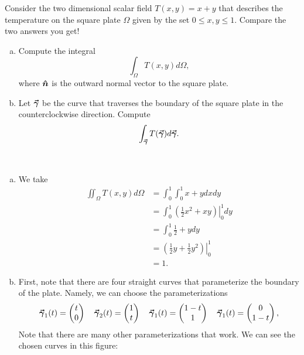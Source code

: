 \documentclass[12pt]{article} %
\begin{document}
\newpage
\begin{problem}
Consider the two dimensional scalar field $T(x,y)=x+y$ that describes the temperature on the square plate $\Omega$ given by the set $0\leq x,y \leq 1$.  Compare the two answers you get!
\begin{enumerate}[(a)]
	\item Compute the integral
	\[
	\int_\Omega T(x,y)d\Omega,
	\]
	where $\boldsymbol{\hat{n}}$ is the outward normal vector to the square plate.
	\item Let $\boldsymbol{\vec{\gamma}}$ be the curve that traverses the boundary of the square plate in the counterclockwise direction.  Compute
	\[
	\int_{\boldsymbol{\vec{\gamma}}} T(\boldsymbol{\vec{\gamma}})d\boldsymbol{\vec{\gamma}}. 
	\]
\end{enumerate}
\end{problem}
\begin{solution} ~
	\begin{enumerate}[(a)]
		\item We take
		\begin{align*}
			\iint_\Omega T(x,y)d\Omega &= \int_0^1 \int_0^1 x+y dxdy\\
			&= \int_0^1 \left.\left(\frac{1}{2}x^2+xy\right)\right\vert_0^1 dy\\
			&= \int_0^1 \frac{1}{2} + y dy\\
			&= \left.\left(\frac{1}{2}y + \frac{1}{2}y^2\right)\right\vert_0^1\\
			&= 1.
		\end{align*}
		\item	First, note that there are four straight curves that parameterize the boundary of the plate.  Namely, we can choose the parameterizations 
		\[
		\boldsymbol{\vec{\gamma}}_1(t) = \begin{pmatrix} t \\ 0 \end{pmatrix} \quad \boldsymbol{\vec{\gamma}}_2(t) = \begin{pmatrix} 1 \\ t \end{pmatrix} \quad \boldsymbol{\vec{\gamma}}_1(t) = \begin{pmatrix} 1-t \\ 1 \end{pmatrix} \quad \boldsymbol{\vec{\gamma}}_1(t) = \begin{pmatrix} 0 \\ 1-t \end{pmatrix},
		\]
		Note that there are many other parameterizations that work. We can see the chosen curves in this figure:
		\begin{figure}[H]

\end{figure}
\end{enumerate}
\end{solution}
\end{document}
